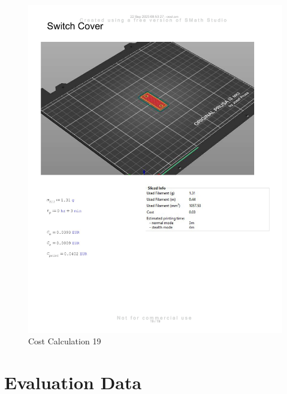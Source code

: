 \begin{figure}[H]
    \centering
    \includegraphics[width=\linewidth]{texs/appendix/data/costcalculation/cost1-19.jpg}
    \caption{Cost Calculation 19}
    \label{fig:cost-calculation-19}
\end{figure}


\section{Evaluation Data}
\label{appendix:evaluation-data}

